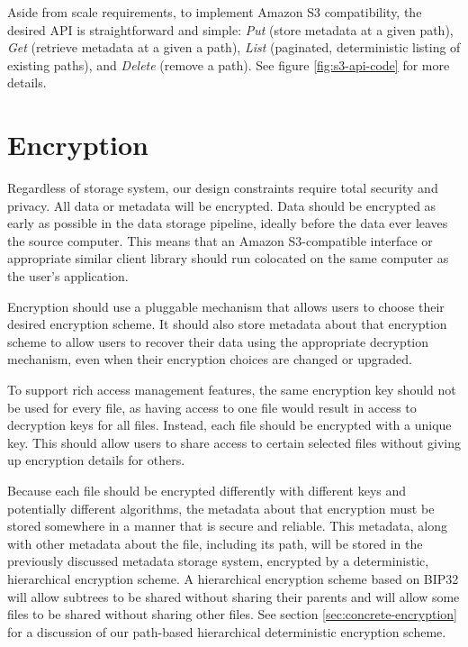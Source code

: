 \documentclass[8pt,fleqn,openany]{book}
\begin{document}
Aside from scale requirements, to implement Amazon S3 compatibility,
the desired API is straightforward and
simple: {\em Put} (store metadata at a given path), {\em Get} (retrieve metadata at a
given a path),
{\em List} (paginated, deterministic listing of existing paths), and {\em Delete}
(remove a path). See figure \ref{fig:s3-api-code} for more details.

\section{Encryption}

Regardless of storage system, our design constraints require total security
and privacy. All data or metadata will be encrypted.
Data should be encrypted as early as possible in the data storage pipeline,
ideally before the data ever leaves the source computer. This means that an
Amazon S3-compatible interface or appropriate similar client library should run
colocated on the same computer as the user's application.

Encryption should use a pluggable mechanism that allows users to choose their
desired encryption scheme. It should also store metadata about that encryption
scheme to allow users to recover their data using the appropriate decryption
mechanism, even when their encryption choices are changed or upgraded.

To support rich access management features, the same encryption key should not
be used for every file, as having access to one file would result in access
to decryption keys for all files. Instead, each file should be encrypted with
a unique key. This should allow users to share access to certain selected files
without giving up encryption details for others.

Because each file should be encrypted differently with different keys and
potentially different algorithms, the metadata about that encryption must
be stored somewhere in a manner that is secure and reliable. This metadata,
along with other metadata about the file, including its path, will
be stored in the previously discussed metadata storage system, encrypted
by a deterministic, hierarchical encryption scheme.
A hierarchical encryption scheme based on
BIP32 \cite{bip32} will allow subtrees to be shared without sharing their
parents and will allow some files to be shared without sharing other files.
See section \ref{sec:concrete-encryption} for a discussion of our path-based
hierarchical deterministic encryption scheme.
\end{document}
